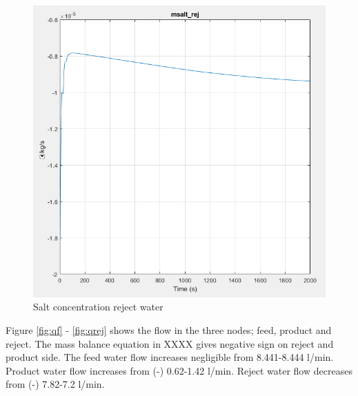 \begin{figure}[h]
  \centering
  \includegraphics[width=0.5\linewidth]{msalt_rej.PNG}
  \caption{Salt concentration reject water}
  \label{fig:msaltr}
\end{figure}
Figure \ref{fig:qf} - \ref{fig:qrej} shows the flow in the three nodes; feed, product and reject. The mass balance equation in XXXX gives negative sign on reject and product side. The feed water flow increases negligible from 8.441-8.444 l/min. Product water flow increases from (-) 0.62-1.42 l/min. Reject water flow decreases from (-) 7.82-7.2 l/min. \\
\\

